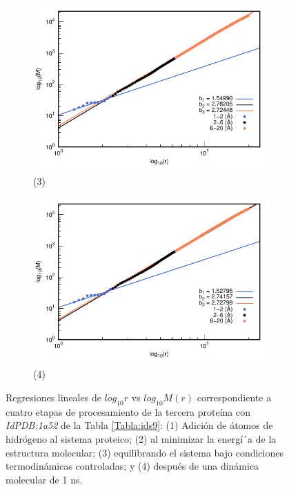 \begin{figure}[H]
	\vspace{0cm} %
	
	\hspace{-0.3cm} 
	\begin{subfigure}{0.49\textwidth}
		\centering
		\includegraphics[width=\linewidth,page=1]{graphs/PDBs/1a52/1a52Eq.pdf}
		\caption{(3)}
	\end{subfigure}
	\hspace{0.2cm}
	\begin{subfigure}{0.49\textwidth} %
		\centering
		\includegraphics[width=\linewidth,page=1]{graphs/PDBs/1a52/1a521ns.pdf}
		\caption{(4)}
	\end{subfigure}
	\caption{Regresiones lineales de $log_{10}r$ vs $log_{10}M(r)$ correspondiente a cuatro etapas de procesamiento de la tercera prote\'{i}na con \textit{IdPDB:1a52} de la Tabla \ref{Tabla:ids9}: (1) Adici\'{o}n de \'{a}tomos de hidr\'{o}geno al sistema proteico; (2) al minimizar la energ\'{i´}a de la estructura molecular; (3) equilibrando el sistema bajo condiciones termodin\'{a}micas controladas; y (4) despu\'{e}s de una din\'{a}mica molecular de 1 ns.}
	\label{fig:1a52}
\end{figure}


